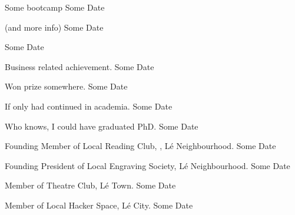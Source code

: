 
    
    
        \cvItemSkill
    	{\faChalkboardTeacher}
    	{Some bootcamp}
    	{Some Date}
    	
        \cvItemSkill
    	{ \faPhotoVideo}
    	{ (and more info)}
    	{Some Date}
    
        \cvItemSkill
    	{\faBook}
    	{}
    	{Some Date}
    	
    
    
    	\cvItemSkill
    	{\faBriefcase}
    	{Business related achievement.}
    	{Some Date}
    	
    	\cvItemSkill
    	{\faMedal}
    	{Won prize somewhere.}
        {Some Date}
    	
    	\cvItemSkill
    	{\faGraduationCap}
    	{If only had continued in academia.}
        {Some Date}
        
        \cvItemSkill
        {\faUserGraduate}
        {Who knows, I could have graduated PhD.}
        {Some Date}
    
        \cvItemSkill
        {\faScroll}
        {Founding Member of Local Reading Club, , L\'{e} Neighbourhood.}
        {Some Date}
        
        \cvItemSkill
        {\faHammer}
        {Founding President of Local Engraving Society, L\'{e} Neighbourhood.}
        {Some Date}
        
        \cvItemSkill
        {\faTheaterMasks}
        {Member of Theatre Club, L\'{e} Town.}
        {Some Date}
        
        \cvItemSkill
        {\faTerminal}
        {Member of Local Hacker Space, L\'{e} City.}
        {Some Date}
    
    
    \null\vfill

